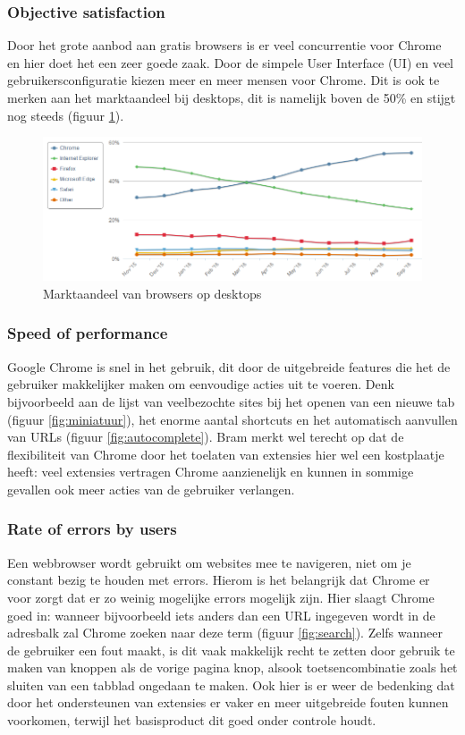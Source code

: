 \documentclass[12pt]{article}
\begin{document}
\subsubsection{Objective satisfaction}
Door het grote aanbod aan gratis browsers is er veel concurrentie voor Chrome en hier doet het een zeer goede zaak. Door de simpele User Interface (UI) en veel gebruikersconfiguratie kiezen meer en meer mensen voor Chrome. Dit is ook te merken aan het marktaandeel bij desktops, dit is namelijk boven de 50\% en stijgt nog steeds (figuur \ref{fig:marktaandeel}). 
\begin{figure}
	\centering
	\includegraphics[width=1.1\textwidth]{marketshare.png}
	\caption{Marktaandeel van browsers op desktops\cite{NetShare}}
	\label{fig:marktaandeel}
\end{figure}
\newpage
\subsubsection{Speed of performance}
Google Chrome is snel in het gebruik, dit door de uitgebreide features die het de gebruiker makkelijker maken om eenvoudige acties uit te voeren. Denk bijvoorbeeld aan de lijst van veelbezochte sites bij het openen van een nieuwe tab (figuur \ref{fig:miniatuur}), het enorme aantal shortcuts\cite{shortcuts} en het automatisch aanvullen van URLs (figuur \ref{fig:autocomplete}). Bram merkt wel terecht op dat de flexibiliteit van Chrome door het toelaten van extensies hier wel een kostplaatje heeft: veel extensies vertragen Chrome aanzienelijk\cite{slow} en kunnen in sommige gevallen ook meer acties van de gebruiker verlangen.
\subsubsection{Rate of errors by users}
Een webbrowser wordt gebruikt om websites mee te navigeren, niet om je constant bezig te houden met errors. Hierom is het belangrijk dat Chrome er voor zorgt dat er zo weinig mogelijke errors mogelijk zijn. Hier slaagt Chrome goed in: wanneer bijvoorbeeld iets anders dan een URL ingegeven wordt in de adresbalk zal Chrome zoeken naar deze term (figuur \ref{fig:search}). Zelfs wanneer de gebruiker een fout maakt, is dit vaak makkelijk recht te zetten door gebruik te maken van knoppen als de vorige pagina knop, alsook toetsencombinatie zoals het sluiten van een tabblad ongedaan te maken. Ook hier is er weer de bedenking dat door het ondersteunen van extensies er vaker en meer uitgebreide fouten kunnen voorkomen, terwijl het basisproduct dit goed onder controle houdt.
\end{document}
